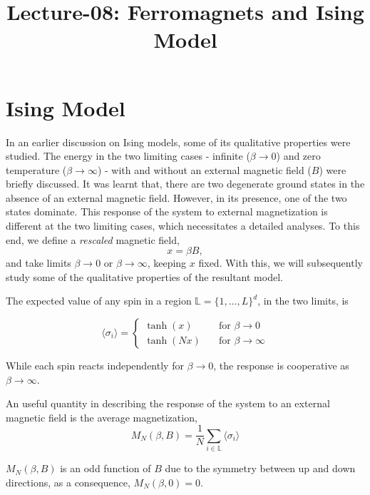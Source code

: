 \documentclass[letterpaper,english,10pt]{article}
\title{Lecture-08: Ferromagnets and Ising Model}
\begin{document}
\maketitle
\section{Ising Model}

In an earlier discussion on Ising models, some of its qualitative properties were studied. 
The energy in the two limiting cases - infinite ($\beta \to 0$) and zero temperature ($\beta \to \infty$) - with and without an external magnetic field ($B$) were briefly discussed. 
It was learnt that, there are two degenerate ground states in the absence of an external magnetic field. However, in its presence, one of the two states dominate. 
This response of the system to external magnetization is different at the two limiting cases, which necessitates a detailed analyses. 
To this end, we define a \textit{rescaled} magnetic field, $$x=\beta B,$$ and take limits $\beta \to 0$ or $\beta \to \infty$, keeping $x$ fixed. 
With this, we will subsequently study some of the qualitative properties of the resultant model.

\begin{defn}
	The expected value of any spin in a region $\mathbb{L}=\{1,\ldots,L\}^{d}$, in the two limits, is  
	
	\[\langle\sigma_{i}\rangle =
	\begin{cases}
	\tanh(x) & \quad \text{for } \beta \to 0 \\
	\tanh(Nx) & \quad \text{for } \beta \to \infty
	\end{cases}	\]

While each spin reacts independently for $\beta \to 0$, the response is cooperative as $\beta \to \infty$.
\end{defn}
\begin{defn} An useful quantity in describing the response of the system to an external magnetic field is the average magnetization,
	$$M_{N}(\beta,B)=\frac{1}{N}\sum_{i\in \mathbb{L}}\langle\sigma_{i}\rangle$$
	
	$M_{N}(\beta,B)$ is an odd function of $B$ due to the symmetry between up and down directions, as a consequence, $M_{N}(\beta,0) = 0$. 

\end{defn}
\end{document}
